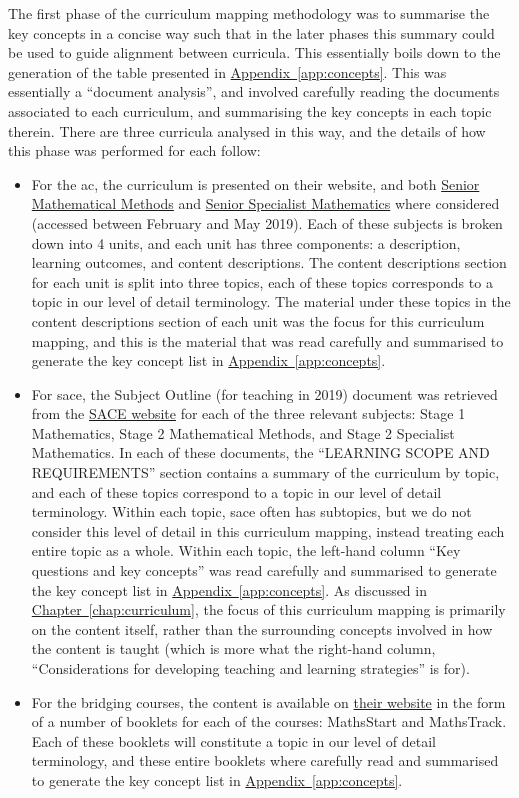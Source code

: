 \documentclass[twoside,12pt,a4paper]{report}
\newcommand{\refchap}[1]{\hyperref[chap:#1]{Chapter~\ref{chap:#1}}}
\newcommand{\refapp}[1]{\hyperref[app:#1]{Appendix~\ref{app:#1}}}
\begin{document}
The first phase of the curriculum mapping methodology was to summarise the key concepts in a concise way such that in the later phases this summary could be used to guide alignment between curricula. This essentially boils down to the generation of the table presented in \refapp{concepts}. This was essentially a ``document analysis'', and involved carefully reading the documents associated to each curriculum, and summarising the key concepts in each topic therein. There are three curricula analysed in this way, and the details of how this phase was performed for each follow:
\begin{itemize}
	\item For the \gls{ac}, the curriculum is presented on their website, and both \href{https://www.australiancurriculum.edu.au/senior-secondary-curriculum/mathematics/mathematical-methods/}{Senior Mathematical Methods} and \href{https://www.australiancurriculum.edu.au/senior-secondary-curriculum/mathematics/specialist-mathematics/}{Senior Specialist Mathematics} where considered (accessed between February and May 2019). Each of these subjects is broken down into 4 units, and each unit has three components: a description, learning outcomes, and content descriptions. The content descriptions section for each unit is split into three topics, each of these topics corresponds to a topic in our level of detail terminology. The material under these topics in the content descriptions section of each unit was the focus for this curriculum mapping, and this is the material that was read carefully and summarised to generate the key concept list in \refapp{concepts}.
	\item For \gls{sace}, the Subject Outline (for teaching in 2019) document was retrieved from the \href{https://www.sace.sa.edu.au/}{SACE website} for each of the three relevant subjects: Stage 1 Mathematics, Stage 2 Mathematical Methods, and Stage 2 Specialist Mathematics. In each of these documents, the ``LEARNING SCOPE AND REQUIREMENTS'' section contains a summary of the curriculum by topic, and each of these topics correspond to a topic in our level of detail terminology. Within each topic, \gls{sace} often has subtopics, but we do not consider this level of detail in this curriculum mapping, instead treating each entire topic as a whole. Within each topic, the left-hand column ``Key questions and key concepts'' was read carefully and summarised to generate the key concept list in \refapp{concepts}. As discussed in \refchap{curriculum}, the focus of this curriculum mapping is primarily on the content itself, rather than the surrounding concepts involved in how the content is taught (which is more what the right-hand column, ``Considerations for developing teaching and learning strategies'' is for). 
	\item For the bridging courses, the content is available on \href{https://www.adelaide.edu.au/mathslearning/bridging/}{their website} in the form of a number of booklets for each of the courses: MathsStart and MathsTrack. Each of these booklets will constitute a topic in our level of detail terminology, and these entire booklets where carefully read and summarised to generate the key concept list in \refapp{concepts}.
\end{itemize}
\end{document}

